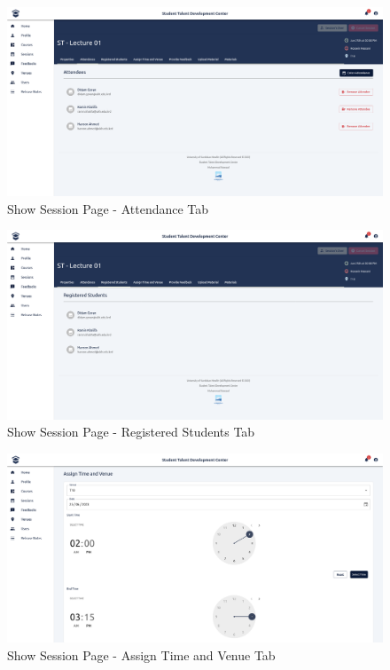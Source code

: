 \begin{justify}
    \begin{figure}[H]
        \centerline{\includegraphics[width=150mm,scale=1]{figures/implementation_and_testing/implementation/frontend/pages/Sessions - Attendance.png}}
        \caption{Show Session Page - Attendance Tab}
    \end{figure}

    \begin{figure}[H]
        \centerline{\includegraphics[width=150mm,scale=1]{figures/implementation_and_testing/implementation/frontend/pages/Sessions - Registered Students.png}}
        \caption{Show Session Page - Registered Students Tab}
    \end{figure}

    \begin{figure}[H]
        \centerline{\includegraphics[width=150mm,scale=1]{figures/implementation_and_testing/implementation/frontend/pages/Sessions - Assign Time and Venue.png}}
        \caption{Show Session Page - Assign Time and Venue Tab}
    \end{figure}


\end{justify}
